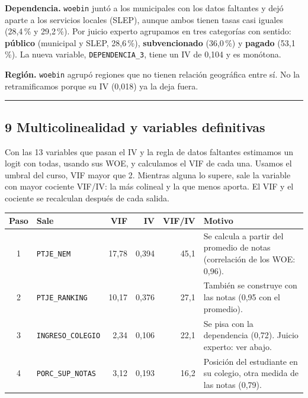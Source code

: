 \documentclass[11pt]{article}
\begin{document}
\textbf{Dependencia.} \texttt{woebin} juntó a los municipales con los
datos faltantes y dejó aparte a los servicios locales (SLEP), aunque
ambos tienen tasas casi iguales (28,4\,\% y 29,2\,\%). Por juicio
experto agrupamos en tres categorías con sentido: \textbf{público}
(municipal y SLEP, 28,6\,\%), \textbf{subvencionado} (36,0\,\%) y
\textbf{pagado} (53,1\,\%). La nueva variable, \texttt{DEPENDENCIA\_3},
tiene un IV de 0,104 y es monótona.

\textbf{Región.} \texttt{woebin} agrupó regiones que no tienen relación
geográfica entre sí. No la retramificamos porque su IV (0,018) ya la deja
fuera.

\medskip\hrule\medskip

\subsection*{9 \; Multicolinealidad y variables definitivas}

Con las 13 variables que pasan el IV y la regla de datos faltantes
estimamos un logit con todas, usando sus WOE, y calculamos el VIF de cada
una. Usamos el umbral del curso, VIF mayor que 2. Mientras alguna lo
supere, sale la variable con mayor cociente VIF/IV: la más colineal y
la que menos aporta. El VIF y el cociente se recalculan después de cada
salida.

\begin{center}
\begin{tabular}{c>{\raggedright\arraybackslash}p{3.3cm}rrr>{\raggedright\arraybackslash}p{5.4cm}}
\toprule
\textbf{Paso} & \textbf{Sale} & \textbf{VIF} & \textbf{IV} & \textbf{VIF/IV} & \textbf{Motivo} \\
\midrule
1 & \texttt{PTJE\_NEM}       & 17,78 & 0,394 & 45,1 & Se calcula a partir del promedio de notas (correlación de los WOE: 0,96). \\
2 & \texttt{PTJE\_RANKING}   & 10,17 & 0,376 & 27,1 & También se construye con las notas (0,95 con el promedio). \\
3 & \texttt{INGRESO\_COLEGIO} & 2,34 & 0,106 & 22,1 & Se pisa con la dependencia (0,72). Juicio experto: ver abajo. \\
4 & \texttt{PORC\_SUP\_NOTAS} & 3,12 & 0,193 & 16,2 & Posición del estudiante en su colegio, otra medida de las notas (0,79). \\
\bottomrule
\end{tabular}
\end{center}
\end{document}
